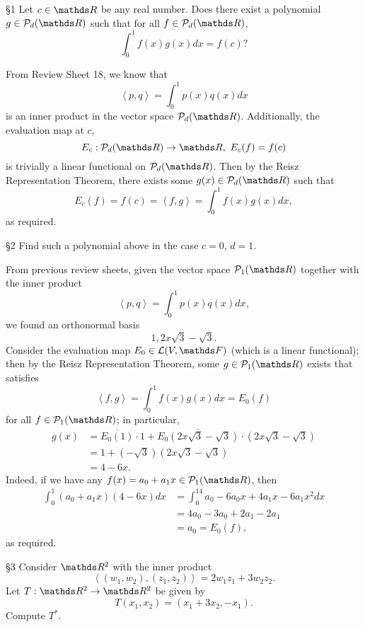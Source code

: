 \documentclass{review-sheet}
\begin{document}
\begin{problem}{\S 1}
  Let $c\in \R$ be any real number. Does there exist a polynomial $g\in \mc{P}_d(\R)$ such that for
  all $f\in \mc{P}_d(\R)$, \[
    \int_0^1f(x)g(x)dx=f(c)
  ?\] 
\end{problem}

\begin{solution}
  From Review Sheet 18, we know that \[
    \left<p,q \right> =\int_0^1p(x)q(x)dx
  \] is an inner product in the vector space $\mc{P}_d(\R)$. Additionally, the evaluation map at
  $c$, \[
    E_c: \mc{P}_d(\R)\to \R,\ E_c(f)=f(c)
  \] is trivially a linear functional on $\mc{P}_d(\R)$. Then by the Reisz Representation Theorem,
  there exists some $g(x)\in \mc{P}_d(\R)$ such that \[
    E_c(f)=f(c)=\left<f,g \right> =\int_0^1f(x)g(x)dx
  ,\] as required.
\end{solution}

\begin{problem}{\S 2}
  Find such a polynomial above in the case $c=0$, $d=1$. 
\end{problem}
\begin{solution}
  From previous review sheets, given the vector space $\mc{P}_1(\R)$ together with the inner product
  \[
    \left<p,q \right> =\int_0^1p(x)q(x)dx
  ,\] we found an orthonormal basis \[
    1, 2x\sqrt{3}-\sqrt{3}
  .\] Consider the evaluation map $E_0\in \mc{L}(V,\F)$ (which is a linear functional); then by the
  Reisz Representation Theorem, some $g\in \mc{P}_1(\R)$ exists that satisfies \[
    \left<f,g \right> =\int_0^1f(x)g(x)dx=E_0(f)
  \] for all $f\in \mc{P}_1(\R)$; in particular,
  \begin{align*}
    g(x)&=\overline{E_0(1)}\cdot 1+\overline{E_0(2x\sqrt{3}-\sqrt{3})}\cdot (2x\sqrt{3}-\sqrt{3})\\
     &=1+(-\sqrt{3})(2x\sqrt{3}-\sqrt{3})\\
     &=4-6x
  .\end{align*}
  Indeed, if we have any $f(x)=a_0+a_1x\in \mc{P}_1(\R)$, then
  \begin{align*}
    \int_0^1(a_0+a_1x)(4-6x)dx&= \int_0^14a_0-6a_0x+4a_1x-6a_1x^2dx \\
    &= 4a_0-3a_0+2a_1-2a_1  \\
    &= a_0=E_0(f)
  ,\end{align*} as required.
\end{solution}


\begin{problem}{\S 3}
  Consider $\R^2$ with the inner product \[
    \left<(w_1,w_2),(z_1,z_2) \right> =2w_1z_1+3w_2z_2
  .\] Let $T:\R^2\to \R^2$ be given by \[
  T(x_1,x_2)=(x_1+3x_2,-x_1)
  .\] Compute $T^*$. 
\end{problem}
\end{document}
